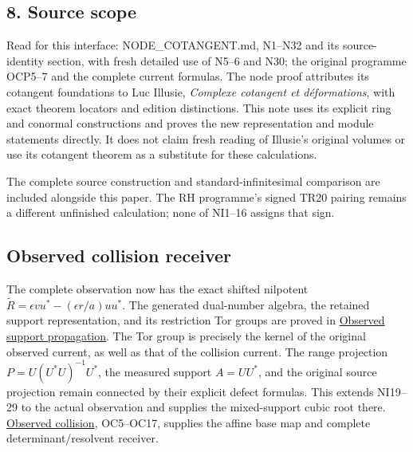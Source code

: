 \documentclass[
]{article}
\begin{document}
\subsection{8. Source scope}\label{source-scope}

Read for this interface: NODE\_COTANGENT.md, N1--N32 and its
source-identity section, with fresh detailed use of N5--6 and N30; the
original programme OCP5--7 and the complete current formulas. The node
proof attributes its cotangent foundations to Luc Illusie,
\emph{Complexe cotangent et déformations}, with exact theorem locators
and edition distinctions. This note uses its explicit ring and conormal
constructions and proves the new representation and module statements
directly. It does not claim fresh reading of Illusie's original volumes
or use its cotangent theorem as a substitute for these calculations.

The complete source construction and standard-infinitesimal comparison
are included alongside this paper. The RH programme's signed TR20
pairing remains a different unfinished calculation; none of NI1--16
assigns that sign.

\subsection{Observed collision
receiver}\label{observed-collision-receiver}

The complete observation now has the exact shifted nilpotent
\(\widetilde R=\epsilon vu^*-(\epsilon r/a)uu^*\). The generated
dual-number algebra, the retained support representation, and its
restriction Tor groups are proved in
\href{https://github.com/KokunoYumeto/zeta-function-research-reader/blob/c9df443d9e1df000dfbb083943f97197e746eb08/workbenches/splitzero-tandem/branches/identity-absorber-square/OBSERVED_SUPPORT_PROPAGATION.md}{Observed
support propagation}. The Tor group is precisely the kernel of the
original observed current, as well as that of the collision current. The
range projection \(P=U(U^*U)^{-1}U^*\), the measured support \(A=UU^*\),
and the original source projection remain connected by their explicit
defect formulas. This extends NI19--29 to the actual observation and
supplies the mixed-support cubic root there.
\href{https://github.com/KokunoYumeto/zeta-function-research-reader/blob/c9df443d9e1df000dfbb083943f97197e746eb08/workbenches/splitzero-tandem/branches/identity-absorber-square/OBSERVED_COLLISION.md}{Observed
collision}, OC5--OC17, supplies the affine base map and complete
determinant/resolvent receiver.
\end{document}
